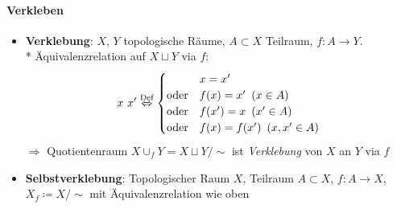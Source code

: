 \paragraph{Verkleben}
\begin{itemize}
  \item \textbf{Verklebung}: \( X \), \( Y \) topologische Räume, \( A \subset X \) Teilraum, \( f: A \to Y \). \\* Äquivalenzrelation auf \( X \sqcup Y \) via \( f \):
  \begin{equation*}
    x ~ x' \overset{\text{Def}}{\Leftrightarrow} \begin{cases}
      & x = x' \\
      \text{oder} &f(x) = x' \enskip (x \in A) \\
      \text{oder} &f(x') = x \enskip (x' \in A) \\
      \text{oder} &f(x) = f(x') \enskip (x,x' \in A)
    \end{cases}
  \end{equation*}
  \( \Rightarrow \) Quotientenraum \( X \cup_f Y = X \sqcup Y /\sim \) ist \emph{Verklebung} von \( X \) an \( Y \) via \( f \)
  \item \textbf{Selbstverklebung}: Topologischer Raum \( X \), Teilraum \( A \subset X \), \( f: A \to X \), \( X_f \coloneqq X/\sim \) mit Äquivalenzrelation wie oben
\end{itemize}